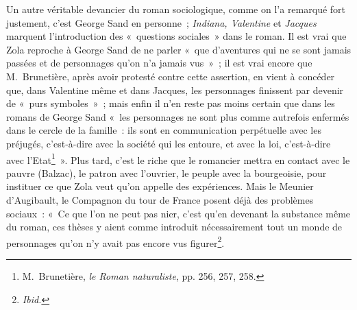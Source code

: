 \documentclass[french,twoside]{book} %
\begin{document}
Un autre véritable devancier du roman sociologique, comme on l’a remarqué fort justement, c’est George Sand en personne ; \emph{Indiana, Valentine} et \emph{Jacques} marquent l’introduction des « questions sociales » dans le roman. Il est vrai que Zola reproche à George Sand de ne parler « que d’aventures qui ne se sont jamais passées et de personnages qu’on n’a jamais vus » ; il est vrai encore que M. Brunetière, après avoir protesté contre cette assertion, en vient à concéder que, dans Valentine même et dans Jacques, les personnages finissent par devenir de « purs symboles » ; mais enfin il n’en reste pas moins certain que dans les romans de George Sand « les personnages ne sont plus comme autrefois enfermés dans le cercle de la famille : ils sont en communication perpétuelle avec les préjugés, c’est-à-dire avec la société qui les entoure, et avec la loi, c’est-à-dire avec l’Etat\footnote{ M. Brunetière, \emph{le Roman naturaliste}, pp. 256, 257, 258.} ». Plus tard, c’est le riche que le romancier mettra en contact avec le pauvre (Balzac), le patron avec l’ouvrier, le peuple avec la bourgeoisie, pour instituer ce que Zola veut qu’on appelle des expériences. Mais le Meunier d’Augibault, le Compagnon du tour de France posent déjà des problèmes sociaux : « Ce que l’on ne peut pas nier, c’est qu’en devenant la substance même du roman, ces thèses y aient comme introduit nécessairement tout un monde de personnages qu’on n’y avait pas encore vus figurer\footnote{\emph{Ibid.}}.\par
\end{document}
